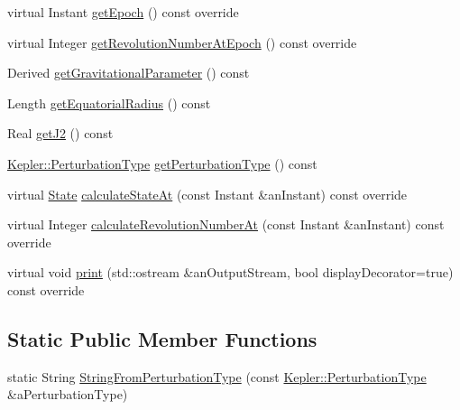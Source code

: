 \begin{DoxyCompactItemize}
\item 
virtual Instant \hyperlink{classlibrary_1_1astro_1_1trajectory_1_1orbit_1_1models_1_1_kepler_a6ecdd4a133cdd936909020b644dd8f1f}{get\+Epoch} () const override
\item 
virtual Integer \hyperlink{classlibrary_1_1astro_1_1trajectory_1_1orbit_1_1models_1_1_kepler_ad8df985c06ca56c1516f3b8804d5052d}{get\+Revolution\+Number\+At\+Epoch} () const override
\item 
Derived \hyperlink{classlibrary_1_1astro_1_1trajectory_1_1orbit_1_1models_1_1_kepler_a65ba42289312a4d54adfbf14589d8dde}{get\+Gravitational\+Parameter} () const
\item 
Length \hyperlink{classlibrary_1_1astro_1_1trajectory_1_1orbit_1_1models_1_1_kepler_a687374bb06a2f805a21ded57f2604c4b}{get\+Equatorial\+Radius} () const
\item 
Real \hyperlink{classlibrary_1_1astro_1_1trajectory_1_1orbit_1_1models_1_1_kepler_ab6a582f7b6ab6f9f22e180378e20b58d}{get\+J2} () const
\item 
\hyperlink{classlibrary_1_1astro_1_1trajectory_1_1orbit_1_1models_1_1_kepler_a7f34995d6f287de65a6edb2d419a2fe0}{Kepler\+::\+Perturbation\+Type} \hyperlink{classlibrary_1_1astro_1_1trajectory_1_1orbit_1_1models_1_1_kepler_a68033efefbad3ba3d52558cecd606820}{get\+Perturbation\+Type} () const
\item 
virtual \hyperlink{classlibrary_1_1astro_1_1trajectory_1_1_state}{State} \hyperlink{classlibrary_1_1astro_1_1trajectory_1_1orbit_1_1models_1_1_kepler_a6354b3545decf1179289383679ebe2cd}{calculate\+State\+At} (const Instant \&an\+Instant) const override
\item 
virtual Integer \hyperlink{classlibrary_1_1astro_1_1trajectory_1_1orbit_1_1models_1_1_kepler_a9ba435e737c10933f39d4817306810eb}{calculate\+Revolution\+Number\+At} (const Instant \&an\+Instant) const override
\item 
virtual void \hyperlink{classlibrary_1_1astro_1_1trajectory_1_1orbit_1_1models_1_1_kepler_a5cecedfe1b2002881b4ef6eeae64af93}{print} (std\+::ostream \&an\+Output\+Stream, bool display\+Decorator=true) const override
\end{DoxyCompactItemize}
\subsection*{Static Public Member Functions}
\begin{DoxyCompactItemize}
\item 
static String \hyperlink{classlibrary_1_1astro_1_1trajectory_1_1orbit_1_1models_1_1_kepler_a0ab0792e822cf9586d55fa17e3950d87}{String\+From\+Perturbation\+Type} (const \hyperlink{classlibrary_1_1astro_1_1trajectory_1_1orbit_1_1models_1_1_kepler_a7f34995d6f287de65a6edb2d419a2fe0}{Kepler\+::\+Perturbation\+Type} \&a\+Perturbation\+Type)
\end{DoxyCompactItemize}
